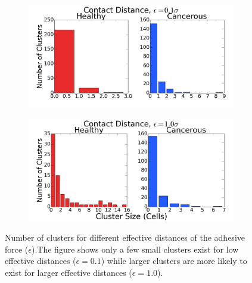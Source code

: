 \documentclass[aps,prb,twocolumn,groupedaddress,nofootinbib,floatfix]{revtex4}
\begin{document}
\begin{figure}
  \begin{subfigure}{\columnwidth}
    \includegraphics[width=1.0\columnwidth]{images/contact1.png}
  \end{subfigure}
  \begin{subfigure}{\columnwidth}
    \includegraphics[width=1.0\columnwidth]{images/contact2.png}
  \end{subfigure}
  \caption{Number of clusters for different effective distances of the adhesive force ($\epsilon$).The figure shows only a few small clusters exist for low effective distances ($\epsilon=0.1$) while larger clusters are more likely to exist for larger effective distances ($\epsilon=1.0$).}
  \label{fig:contact}
\end{figure}
\end{document}
